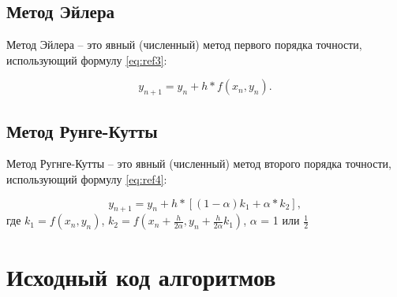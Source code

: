 \documentclass[12pt]{report}
\begin{document}
\section{Метод Эйлера}
Метод Эйлера -- это явный (численный) метод первого порядка точности, использующий формулу \ref{eq:ref3}:

\begin{equation}
	y_{n+1} = y_n + h*f(x_n, y_n).
	\label{eq:ref3}
\end{equation}


\section{Метод Рунге-Кутты}

Метод Ругнге-Кутты -- это явный (численный) метод второго порядка точности, использующий формулу \ref{eq:ref4}:


\begin{equation}
	y_{n+1} = y_n + h*[(1-\alpha)k_1 + \alpha * k_2],
	\label{eq:ref4}
\end{equation}
где $k_1 = f(x_n, y_n)$, $k_2 = f(x_n + \frac{h}{2\alpha}, y_n + \frac{h}{2\alpha}k_1)$, $\alpha$ = 1 или $\frac{1}{2}$
 



\chapter{Исходный код алгоритмов}
\end{document}
